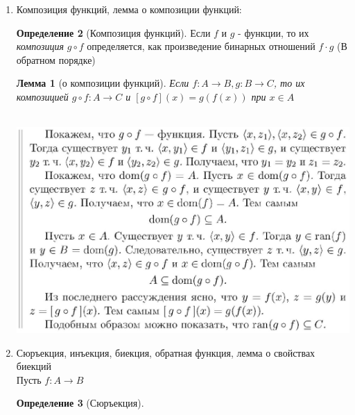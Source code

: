\documentclass[a4paper]{article}
\newtheorem*{lemma*}{Лемма}
\theoremstyle{definition}
\newtheorem*{definition*}{Определение}
\begin{document}
\begin{enumerate}
\begin{proof}
        $\Leftarrow$ пусть $<x,y>\in{f} \Rightarrow x\in{dom(f)}$ и $y=f(x) \xRightarrow[]{\text{Т.к }f(x)=g(x)}\ y=g(x)\Rightarrow <x,y>\in{g} \xRightarrow{\text{В силу произвольности выбора}} f(x) \leq g(x)$ Обратное по аналогии
       \end{proof}
       \begin{definition*}[Тождественная функция]
        Для любого множества $A
         \\ \exists{f} = \{<x,x>| x\in{A}\} = id_{A}$.
        \\ Ясно, что $id_{A}:A\rightarrow{B}$\\ и $\forall{x}\in{A} \ id_{A}(x) = x$
       \end{definition*}
 \item Композиция функций, лемма о композиции функций:
       \begin{definition*}[Композиция функций]
        Если $f$ и $g$ - функции, то их \textit{композиция} $g\circ{f}$ определяется, как произведение бинарных отношений $f\cdot{g}$ (В обратном порядке)
       \end{definition*}
       \begin{lemma*}[о композиции функций]
        Если $f: A \rightarrow B, g:B\rightarrow C$, то их композицией $g\circ{f} : A\rightarrow C$
        и $[g\circ{f}](x)=g(f(x))$ при $x\in{A}$
       \end{lemma*}
       \mbox{}\\\includegraphics[scale=0.5]{5_1.jpg}\\
 \item Сюръекция, инъекция, биекция, обратная функция, лемма о свойствах биекций
       \\ Пусть $ f: A \rightarrow B$
       \begin{definition*}[Сюръекция]

\end{definition*}
\end{enumerate}
\end{document}
